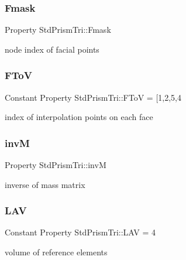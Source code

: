 \subsubsection{\texorpdfstring{Fmask}{Fmask}}
{\footnotesize\ttfamily Property Std\+Prism\+Tri\+::\+Fmask\hspace{0.3cm}{\ttfamily [protected]}}



node index of facial points 

\mbox{\label{class_std_prism_tri_ae5f4fe1b8473e8313acad8f0bf9adcd5}} 
\subsubsection{\texorpdfstring{F\+ToV}{FToV}}
{\footnotesize\ttfamily Constant Property Std\+Prism\+Tri\+::\+F\+ToV = \mbox{[}1,2,5,4}



index of interpolation points on each face 

\mbox{\label{class_std_prism_tri_a4542d6911c6759f3ba78afe6161d01cd}} 
\subsubsection{\texorpdfstring{invM}{invM}}
{\footnotesize\ttfamily Property Std\+Prism\+Tri\+::invM\hspace{0.3cm}{\ttfamily [protected]}}



inverse of mass matrix 

\mbox{\label{class_std_prism_tri_a589701d6be2784f667b7608d32205a6e}} 
\subsubsection{\texorpdfstring{L\+AV}{LAV}}
{\footnotesize\ttfamily Constant Property Std\+Prism\+Tri\+::\+L\+AV = 4}



volume of reference elements 

